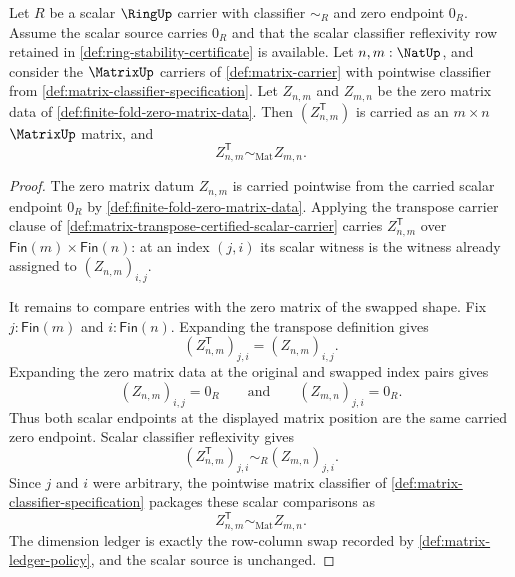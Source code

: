 \begin{theorem}
\label{thm:zero-matrix-transpose-swaps-dimensions}
Let $R$ be a scalar $\RingUp$ carrier with classifier $\sim_R$ and zero endpoint $0_R$. Assume the scalar source carries $0_R$ and that the scalar classifier reflexivity row retained in \autoref{def:ring-stability-certificate} is available. Let $n,m:\NatUp$, and consider the $\MatrixUp$ carriers of \autoref{def:matrix-carrier} with pointwise classifier from \autoref{def:matrix-classifier-specification}. Let $Z_{n,m}$ and $Z_{m,n}$ be the zero matrix data of \autoref{def:finite-fold-zero-matrix-data}. Then $(Z_{n,m}^{\mathsf{T}})$ is carried as an $m\times n$ $\MatrixUp$ matrix, and
$$
Z_{n,m}^{\mathsf{T}}\sim_{\mathrm{Mat}}Z_{m,n}.
$$
\end{theorem}
\begin{proof}
The zero matrix datum $Z_{n,m}$ is carried pointwise from the carried scalar endpoint $0_R$ by \autoref{def:finite-fold-zero-matrix-data}. Applying the transpose carrier clause of \autoref{def:matrix-transpose-certified-scalar-carrier} carries $Z_{n,m}^{\mathsf{T}}$ over $\mathsf{Fin}(m)\times\mathsf{Fin}(n)$: at an index $(j,i)$ its scalar witness is the witness already assigned to $(Z_{n,m})_{i,j}$.

It remains to compare entries with the zero matrix of the swapped shape. Fix $j:\mathsf{Fin}(m)$ and $i:\mathsf{Fin}(n)$. Expanding the transpose definition gives
$$
(Z_{n,m}^{\mathsf{T}})_{j,i}=(Z_{n,m})_{i,j}.
$$
Expanding the zero matrix data at the original and swapped index pairs gives
$$
(Z_{n,m})_{i,j}=0_R
\qquad\text{and}\qquad
(Z_{m,n})_{j,i}=0_R.
$$
Thus both scalar endpoints at the displayed matrix position are the same carried zero endpoint. Scalar classifier reflexivity gives
$$
(Z_{n,m}^{\mathsf{T}})_{j,i}\sim_R(Z_{m,n})_{j,i}.
$$
Since $j$ and $i$ were arbitrary, the pointwise matrix classifier of \autoref{def:matrix-classifier-specification} packages these scalar comparisons as
$$
Z_{n,m}^{\mathsf{T}}\sim_{\mathrm{Mat}}Z_{m,n}.
$$
The dimension ledger is exactly the row-column swap recorded by \autoref{def:matrix-ledger-policy}, and the scalar source is unchanged.
\end{proof}
